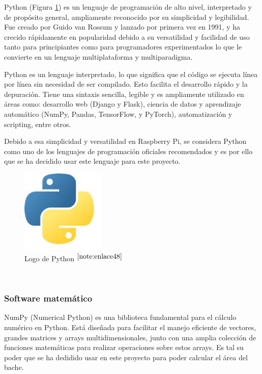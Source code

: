 Python (Figura \ref{fig:python}) es un lenguaje de programación de alto nivel, interpretado y de propósito general, ampliamente reconocido por su simplicidad y legibilidad. Fue creado por Guido van Rossum y lanzado por primera vez en 1991, y ha crecido rápidamente en popularidad debido a su versatilidad y facilidad de uso tanto para principiantes como para programadores experimentados lo que le convierte en un lenguaje multiplataforma y multiparadigma.

Python es un lenguaje interpretado, lo que significa que el código se ejecuta línea por línea sin necesidad de ser compilado. Esto facilita el desarrollo rápido y la depuración. Tiene una sintaxis sencilla, legible y es ampliamente utilizado en áreas como: desarrollo web (Django y Flask), ciencia de datos y aprendizaje automático (NumPy, Pandas, TensorFlow, y PyTorch), automatización y scripting, entre otros.

Debido a esa simplicidad y versatilidad en Raspberry Pi, se considera Python como uno de los lenguajes de programación oficiales recomendados y es por ello que se ha decidido usar este lenguaje para este proyecto.

\begin{figure} [h!]
	\begin{center}
		\includegraphics[width=4cm]{figs/python.png}
	\end{center}
	\caption{Logo de Python $^{\ref{note:enlace48}}$} 
	\label{fig:python}
\end{figure}\

\setcounter{footnote}{48} %

\subsubsection{Software matemático}

NumPy (Numerical Python) es una biblioteca fundamental para el cálculo numérico en Python. Está diseñada para facilitar el manejo eficiente de vectores, grandes matrices y arrays multidimensionales, junto con una amplia colección de funciones matemáticas para realizar operaciones sobre estos arrays. Es tal su poder que se ha dedidido usar en este proyecto para poder calcular el área del bache.

